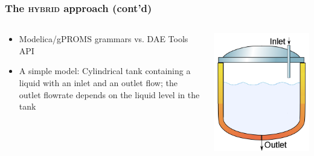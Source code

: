 \documentclass[compress,newPxFont,sthlmFooter]{beamer}
\begin{document}
\begin{frame}[plain]
\frametitle{The \textsc{hybrid} approach (cont'd)}
    \begin{columns}[c]
      \begin{column}{0.7\paperwidth}
        {\small
         \begin{itemize}
            \item \textcolor{sthlmRed}{Modelica}/\textcolor{sthlmRed}{gPROMS} grammars vs. \textcolor{sthlmRed}{DAE Tools API} 
            \item A simple model: \newline
                    {\scriptsize
                        Cylindrical tank containing a liquid with an inlet and an outlet flow;  
                        the outlet flowrate depends on the liquid level in the tank
                    }
        \end{itemize}
        }
      \end{column}
      
      \begin{column}{0.3\paperwidth}
        \begin{center}
          \includegraphics[align=c, width=0.17\paperwidth]{buffer_tank.png}
        \end{center}
      \end{column}
    \end{columns}


\end{frame}
\end{document}
